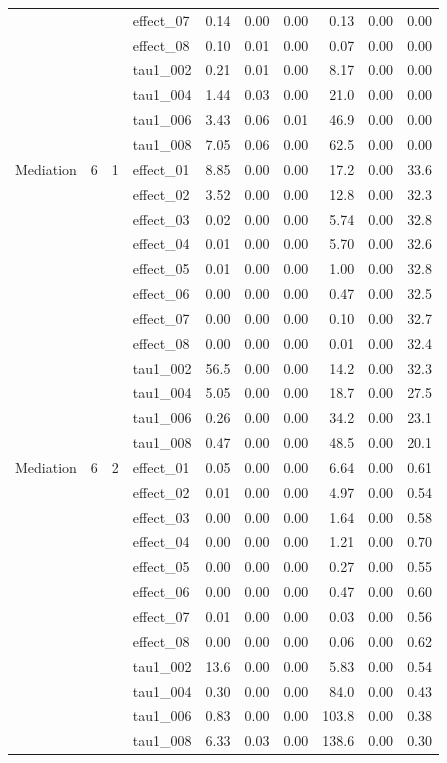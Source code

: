 {\begin{longtable}{lccl rr r r rr}
 &  &  & effect\_07 & 0.14 & 0.00 & 0.00 & 0.13 & 0.00 & 0.00\\
 &  &  & effect\_08 & 0.10 & 0.01 & 0.00 & 0.07 & 0.00 & 0.00\\
 &  &  & tau1\_002 & 0.21 & 0.01 & 0.00 & 8.17 & 0.00 & 0.00\\
 &  &  & tau1\_004 & 1.44 & 0.03 & 0.00 & 21.0 & 0.00 & 0.00\\
 &  &  & tau1\_006 & 3.43 & 0.06 & 0.01 & 46.9 & 0.00 & 0.00\\
 &  &  & tau1\_008 & 7.05 & 0.06 & 0.00 & 62.5 & 0.00 & 0.00\\
\midrule
Mediation & 6 & 1 & effect\_01 & 8.85 & 0.00 & 0.00 & 17.2 & 0.00 & 33.6\\
 &  &  & effect\_02 & 3.52 & 0.00 & 0.00 & 12.8 & 0.00 & 32.3\\
 &  &  & effect\_03 & 0.02 & 0.00 & 0.00 & 5.74 & 0.00 & 32.8\\
 &  &  & effect\_04 & 0.01 & 0.00 & 0.00 & 5.70 & 0.00 & 32.6\\
 &  &  & effect\_05 & 0.01 & 0.00 & 0.00 & 1.00 & 0.00 & 32.8\\
 &  &  & effect\_06 & 0.00 & 0.00 & 0.00 & 0.47 & 0.00 & 32.5\\
 &  &  & effect\_07 & 0.00 & 0.00 & 0.00 & 0.10 & 0.00 & 32.7\\
 &  &  & effect\_08 & 0.00 & 0.00 & 0.00 & 0.01 & 0.00 & 32.4\\
 &  &  & tau1\_002 & 56.5 & 0.00 & 0.00 & 14.2 & 0.00 & 32.3\\
 &  &  & tau1\_004 & 5.05 & 0.00 & 0.00 & 18.7 & 0.00 & 27.5\\
 &  &  & tau1\_006 & 0.26 & 0.00 & 0.00 & 34.2 & 0.00 & 23.1\\
 &  &  & tau1\_008 & 0.47 & 0.00 & 0.00 & 48.5 & 0.00 & 20.1\\
\midrule
Mediation & 6 & 2 & effect\_01 & 0.05 & 0.00 & 0.00 & 6.64 & 0.00 & 0.61\\
 &  &  & effect\_02 & 0.01 & 0.00 & 0.00 & 4.97 & 0.00 & 0.54\\
 &  &  & effect\_03 & 0.00 & 0.00 & 0.00 & 1.64 & 0.00 & 0.58\\
 &  &  & effect\_04 & 0.00 & 0.00 & 0.00 & 1.21 & 0.00 & 0.70\\
 &  &  & effect\_05 & 0.00 & 0.00 & 0.00 & 0.27 & 0.00 & 0.55\\
 &  &  & effect\_06 & 0.00 & 0.00 & 0.00 & 0.47 & 0.00 & 0.60\\
 &  &  & effect\_07 & 0.01 & 0.00 & 0.00 & 0.03 & 0.00 & 0.56\\
 &  &  & effect\_08 & 0.00 & 0.00 & 0.00 & 0.06 & 0.00 & 0.62\\
 &  &  & tau1\_002 & 13.6 & 0.00 & 0.00 & 5.83 & 0.00 & 0.54\\
 &  &  & tau1\_004 & 0.30 & 0.00 & 0.00 & 84.0 & 0.00 & 0.43\\
 &  &  & tau1\_006 & 0.83 & 0.00 & 0.00 & 103.8 & 0.00 & 0.38\\
 &  &  & tau1\_008 & 6.33 & 0.03 & 0.00 & 138.6 & 0.00 & 0.30\\
\end{longtable}}
